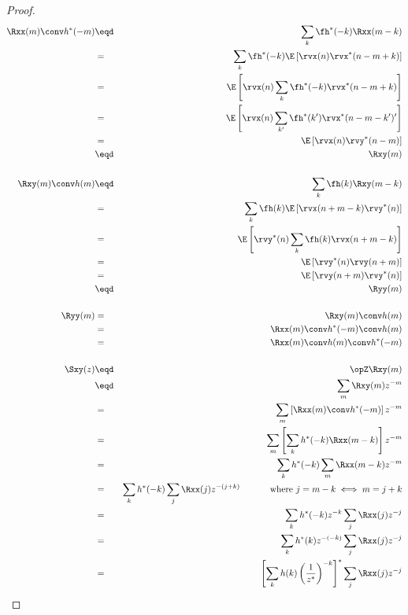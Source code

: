 \begin{proof}
\begin{eqnarray*}
   \Rxx(m) \conv h^\ast(-m)
     &\eqd& \sum_k \fh^\ast(-k) \Rxx(m-k)
   \\&=&    \sum_k \fh^\ast(-k) \E\left[\rvx(n) \rvx^\ast(n-m+k) \right]
   \\&=&    \E\left[\rvx(n) \sum_k \fh^\ast(-k)  \rvx^\ast(n-m+k)     \right]
   \\&=&    \E\left[\rvx(n) \sum_{k^\prime} \fh^\ast(k^\prime)  \rvx^\ast(n-m-k^\prime)  ^\prime   \right]
   \\&=&    \E\left[\rvx(n) \rvy^\ast(n-m)  \right]
   \\&\eqd& \Rxy(m)
\\
\\
   \Rxy(m) \conv h(m)
     &\eqd& \sum_k \fh(k) \Rxy(m-k)
   \\&=&    \sum_k \fh(k) \E\left[\rvx(n+m-k) \rvy^\ast(n) \right]
   \\&=&    \E\left[\rvy^\ast(n) \sum_k \fh(k) \rvx(n+m-k)    \right]
   \\&=&    \E\left[\rvy^\ast(n) \rvy(n+m) \right]
   \\&=&    \E\left[ \rvy(n+m) \rvy^\ast(n)\right]
   \\&\eqd& \Ryy(m)
\\
\\
   \Ryy(m)
     &=& \Rxy(m) \conv h(m)
   \\&=& \Rxx(m) \conv h^\ast(-m) \conv h(m)
   \\&=& \Rxx(m) \conv h(m)  \conv h^\ast(-m)
\\
\\
  \Sxy(z)
     &\eqd& \opZ \Rxy(m)
   \\&\eqd& \sum_m \Rxy(m) z^{-m}
   \\&=&    \sum_m \left[ \Rxx(m) \conv h^\ast(-m) \right] z^{-m}
   \\&=&    \sum_m \left[ \sum_k h^\ast(-k) \Rxx(m-k)  \right] z^{-m}
   \\&=&    \sum_k h^\ast(-k) \sum_m \Rxx(m-k)z^{-m}
   \\&=&    \sum_k h^\ast(-k) \sum_j \Rxx(j)z^{-(j+k)}
            \hspace{3em}\mbox{ where $j=m-k\iff m=j+k$}
   \\&=&    \sum_k h^\ast(-k) z^{-k}   \sum_j \Rxx(j)z^{-j}
   \\&=&    \sum_k h^\ast(k) z^{-(-k)}   \sum_j \Rxx(j)z^{-j}
   \\&=&    \left[\sum_k h(k) \left(\frac{1}{z^\ast}\right)^{-k} \right]^\ast  \sum_j \Rxx(j)z^{-j}

\end{eqnarray*}
\end{proof}
